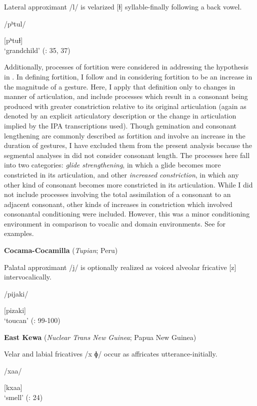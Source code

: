 Lateral approximant /l/ is velarized [ɫ] syllable-finally following a back vowel.

/pʰtul/

[pʰtuɫ]\\
\glt ‘grandchild’
(\citealt{Haspelmath1993}: 35, 37)
\z

  Additionally, processes of fortition were considered in addressing the hypothesis in . In defining fortition, I follow \citet{Bybee2015b} and \citet{BybeeEasterday2019} in considering fortition to be an increase in the magnitude of a gesture. Here, I apply that definition only to changes in manner of articulation, and include processes which result in a consonant being produced with greater constriction relative to its original articulation (again as denoted by an explicit articulatory description or the change in articulation implied by the IPA transcriptions used). Though gemination and consonant lengthening are commonly described as fortition and involve an increase in the duration of gestures, I have excluded them from the present analysis because the segmental analyses in  did not consider consonant length. The processes here fall into two categories: \textit{glide strengthening}, in which a glide becomes more constricted in its articulation, and other \textit{increased constriction}, in which any other kind of consonant becomes more constricted in its articulation. While I did not include processes involving the total assimilation of a consonant to an adjacent consonant, other kinds of increases in constriction which involved consonantal conditioning were included. However, this was a minor conditioning environment in comparison to vocalic and domain environments. See  for examples.

\ea\label{ex:7.9}
  \textbf{Cocama-Cocamilla} (\textit{Tupian}; Peru)

Palatal approximant /j/ is optionally realized as voiced alveolar fricative [z] intervocalically.

/pijaki/

[pizaki]\\
\glt ‘toucan’
(\citealt{VallejosYopán2010}: 99-100)
\z

\ea\label{ex:7.10}
  \textbf{East Kewa} (\textit{Nuclear Trans New Guinea}; Papua New Guinea)

Velar and labial fricatives /x ɸ/ occur as affricates utterance-initially.

/xaa/

[kxaa]\\
\glt ‘smell’
(\citealt{FranklinFranklin1978}: 24)
\z

